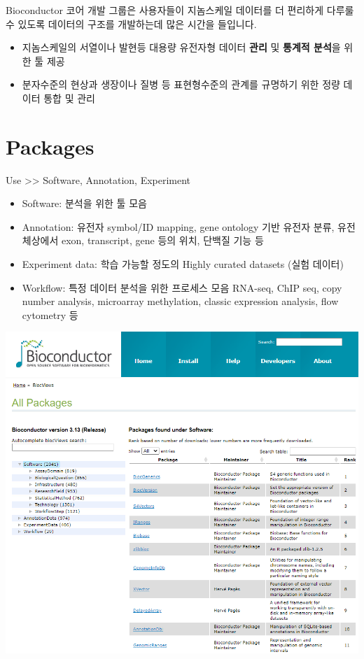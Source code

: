 \documentclass[
]{book}
\providecommand{\tightlist}{%
  \setlength{\itemsep}{0pt}\setlength{\parskip}{0pt}}
\begin{document}
Bioconductor 코어 개발 그룹은 사용자들이 지놈스케일 데이터를 더 편리하게 다루룰 수 있도록 데이터의 구조를 개발하는데 많은 시간을 들입니다.

\begin{itemize}
\tightlist
\item
  지놈스케일의 서열이나 발현등 대용량 유전자형 데이터 \textbf{관리} 및 \textbf{통계적 분석}을 위한 툴 제공
\item
  분자수준의 현상과 생장이나 질병 등 표현형수준의 관계를 규명하기 위한 정량 데이터 통합 및 관리
\end{itemize}

\hypertarget{packages}{%
\section{Packages}\label{packages}}

Use \textgreater\textgreater{} Software, Annotation, Experiment

\begin{itemize}
\tightlist
\item
  Software: 분석을 위한 툴 모음
\item
  Annotation: 유전자 symbol/ID mapping, gene ontology 기반 유전자 분류, 유전체상에서 exon, transcript, gene 등의 위치, 단백질 기능 등
\item
  Experiment data: 학습 가능할 정도의 Highly curated datasets (실험 데이터)
\item
  Workflow: 특정 데이터 분석을 위한 프로세스 모음 RNA-seq, ChIP seq, copy number analysis, microarray methylation, classic expression analysis, flow cytometry 등
\end{itemize}

\includegraphics[width=6.25in,height=\textheight]{images/bioconductor_list.PNG}
\end{document}
